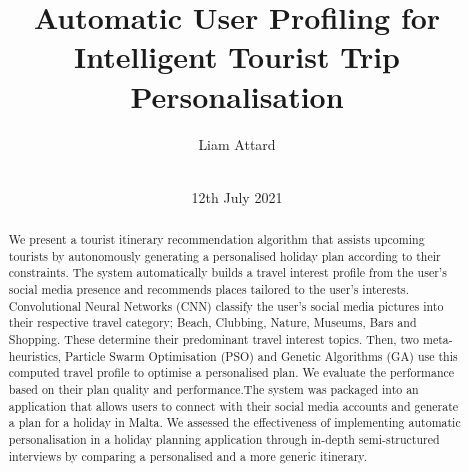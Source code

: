 \documentclass{sig-alternate}
\begin{document}
\title{Automatic User Proﬁling for Intelligent
Tourist Trip Personalisation}
\author{
\alignauthor
Liam Attard\\
       \\
   }

\date{12th July 2021}

\makeatletter
\def\@copyrightspace{\relax}
\makeatother

\maketitle
\begin{abstract}

We present a tourist itinerary recommendation
algorithm that assists upcoming tourists by
autonomously generating a personalised holiday plan
according to their constraints. The system
automatically builds a travel interest profile from
the user's social media presence and recommends places
tailored to the user's interests.  Convolutional
Neural Networks (CNN) classify the user's social media
pictures into their respective travel category; Beach,
Clubbing, Nature, Museums, Bars and Shopping. These
determine their predominant travel interest topics.
Then, two meta-heuristics, Particle Swarm
Optimisation (PSO) and Genetic Algorithms (GA) use this
computed travel profile to optimise a personalised
plan. We evaluate the performance based on their plan
quality and performance.The system was packaged into an application that
allows users to connect with their social media
accounts and generate a plan for a holiday in Malta.
We assessed the effectiveness of implementing
automatic personalisation in a holiday planning
application through in-depth semi-structured
interviews by comparing a personalised and a more
generic itinerary.


\end{abstract}
















\end{document}
